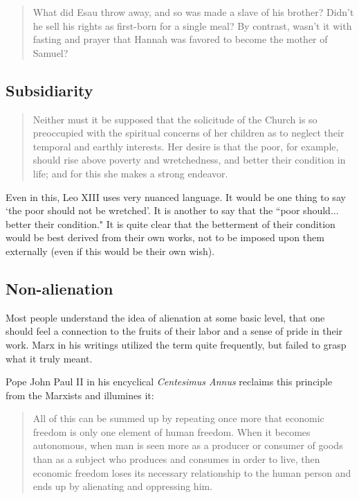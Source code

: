 \documentclass[letterpaper]{article}
\begin{document}
\begin{quote}
  What did Esau throw away, and so was made a slave of his brother? Didn’t he sell his rights as first-born for a single meal? By contrast, wasn’t it with fasting and prayer that Hannah was favored to become the mother of Samuel?
\end{quote}
\fi

\subsection{Subsidiarity}

\begin{quote}
  Neither must it be supposed that the solicitude of the Church is so preoccupied with the spiritual concerns of her children as to neglect their temporal and earthly interests. Her desire is that the poor, for example, should rise above poverty and wretchedness, and better their condition in life; and for this she makes a strong endeavor.
\end{quote}

Even in this, Leo XIII uses very nuanced language. It would be one thing to say `the poor should not be wretched'. It is another to say that the ``poor should... better their condition."  It is quite clear that the betterment of their condition would be best derived from their own works, not to be imposed upon them externally (even if this would be their own wish).

\subsection{Non-alienation}

Most people understand the idea of alienation at some basic level, that one should feel a connection to the fruits of their labor and a sense of pride in their work. Marx in his writings utilized the term quite frequently, but failed to grasp what it truly meant.

Pope John Paul II in his encyclical \textit{Centesimus Annus} reclaims this principle from the Marxists and illumines it:

\begin{quote}
  All of this can be summed up by repeating once more that economic freedom is only one element of human freedom. When it becomes autonomous, when man is seen more as a producer or consumer of goods than as a subject who produces and consumes in order to live, then economic freedom loses its necessary relationship to the human person and ends up by alienating and oppressing him.
\end{quote}
\end{document}
